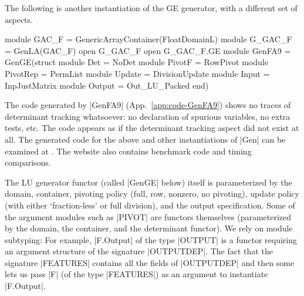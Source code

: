 \documentclass{elsart}
\begin{document}
The following is another instantiation of the GE generator, with a
different set of aspects.
\begin{code}
module GAC_F = GenericArrayContainer(FloatDomainL)
module G_GAC_F = GenLA(GAC_F)
open G_GAC_F
open G_GAC_F.GE
module GenFA9 = GenGE(struct 
    module Det = NoDet
    module PivotF = RowPivot
    module PivotRep = PermList
    module Update = DivisionUpdate
    module Input = InpJustMatrix
    module Output = Out_LU_Packed end)
\end{code}
The code generated by |GenFA9| (App.~\ref{app:code-GenFA9}) shows no traces of
determinant tracking whatsoever: no declaration of spurious variables,
no extra tests, etc. The code appears as if the determinant tracking
aspect did not exist at all. The generated code for the above and
other instantiations of |Gen| can be examined at
\cite{metamonadsURL}. The website also contains benchmark code and
timing comparisons.

The LU generator functor (called |GenGE| below) itself is
parameterized by the domain, container, pivoting policy (full, row,
nonzero, no pivoting), update policy (with either `fraction-less' or
full division), and the output specification. Some of the argument
modules such as |PIVOT| are functors themselves (parameterized by the
domain, the container, and the determinant functor).  We rely on
module subtyping: For example, |F.Output| of the type |OUTPUT| is a
functor requiring an argument structure of the signature
|OUTPUTDEP|. The fact that the signature |FEATURES| contains all the
fields of |OUTPUTDEP| and then some lets us pass |F| (of the type
|FEATURES|) as an argument to instantiate |F.Output|.
\end{document}
